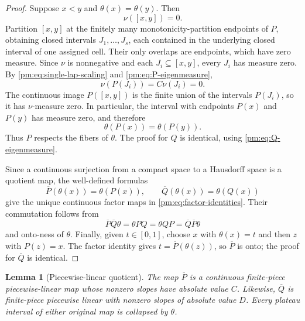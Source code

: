 \documentclass[11pt]{article}
\newtheorem{lemma}[theorem]{Lemma}
\theoremstyle{definition}
\theoremstyle{remark}
\newcommand{\I}{[0,1]}
\begin{document}
\begin{proof}
Suppose $x<y$ and $\theta(x)=\theta(y)$.  Then
\[
 \nu([x,y])=0.
\]
Partition $[x,y]$ at the finitely many monotonicity-partition endpoints of
$P$, obtaining closed intervals $J_1,\ldots,J_s$, each contained in the
underlying closed interval of one assigned cell.  Their only overlaps are
endpoints, which have zero measure.  Since $\nu$ is nonnegative and each
$J_i\subseteq[x,y]$, every $J_i$ has measure zero.  By
\eqref{pm:eq:single-lap-scaling} and
\eqref{pm:eq:P-eigenmeasure},
\[
 \nu(P(J_i))=C\nu(J_i)=0.
\]
The continuous image $P([x,y])$ is the finite union of the intervals
$P(J_i)$, so it has $\nu$-measure zero.  In particular, the interval with
endpoints $P(x)$ and $P(y)$ has measure zero, and therefore
\[
 \theta(P(x))=\theta(P(y)).
\]
Thus $P$ respects the fibers of $\theta$.  The proof for $Q$ is identical,
using \eqref{pm:eq:Q-eigenmeasure}.

Since a continuous surjection from a compact space to a Hausdorff space is
a quotient map, the well-defined formulas
\[
 \overline P(\theta(x))=\theta(P(x)),\qquad
 \overline Q(\theta(x))=\theta(Q(x))
\]
give the unique continuous factor maps in
\eqref{pm:eq:factor-identities}.  Their commutation follows from
\[
 \overline P\overline Q\theta=\theta PQ
 =\theta QP=\overline Q\overline P\theta
\]
and onto-ness of $\theta$.  Finally, given $t\in\I$, choose $x$ with
$\theta(x)=t$ and then $z$ with $P(z)=x$.  The factor identity gives
$t=\overline P(\theta(z))$, so $\overline P$ is onto; the proof for
$\overline Q$ is identical.
\end{proof}

\begin{lemma}[Piecewise-linear quotient]\label{pm:lem:PL-quotient}
The map $\overline P$ is a continuous finite-piece piecewise-linear map
whose nonzero slopes have absolute value $C$.  Likewise, $\overline Q$ is
finite-piece piecewise linear with nonzero slopes of absolute value $D$.
Every plateau interval of either original map is collapsed by $\theta$.
\end{lemma}
\end{document}
